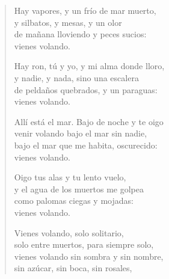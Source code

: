 \documentclass[12pt]{article}
\begin{document}
\begin{verse}
Hay vapores, y un frío de mar muerto,\\
y silbatos, y mesas, y un olor\\
de mañana lloviendo y peces sucios:\\
vienes volando.  

Hay ron, tú y yo, y mi alma donde lloro,\\
y nadie, y nada, sino una escalera\\
de peldaños quebrados, y un paraguas:\\
vienes volando.  

Allí está el mar. Bajo de noche y te oigo\\
venir volando bajo el mar sin nadie,\\
bajo el mar que me habita, oscurecido:\\
vienes volando.  

Oigo tus alas y tu lento vuelo,\\
y el agua de los muertos me golpea\\
como palomas ciegas y mojadas:\\
vienes volando.  

Vienes volando, solo solitario,\\
solo entre muertos, para siempre solo,\\
vienes volando sin sombra y sin nombre,\\
sin azúcar, sin boca, sin rosales,  

\end{verse}
\end{document}
